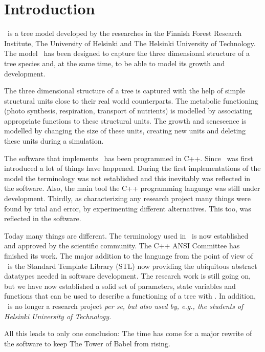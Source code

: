 \section{Introduction}

\lignum\ is a tree model developed by the researches in the  Finnish
Forest Research Institute, The University of Helsinki and The Helsinki
University of  Technology.   The model \lignum\  has  been designed to
capture the three dimensional structure of  a tree species and, at the
same time, to be able to model its growth and development.

The three dimensional structure of a tree is captured with the help of
simple structural  units close to their  real  world counterparts. The
metabolic  functioning (photo  synthesis,  respiration,  transport  of
nutrients) is modelled by  associating appropriate functions to  these
structural units.  The growth and  senescence is  modelled by changing
the size of  these units, creating  new units and deleting these units
during a simulation.

The  software  that implements \lignum\  has   been programmed in C++.
Since   \lignum\   was      first    introduced  \cite{salminen:omt94,
perttunen:aob96}  a lot  of things   have  happened. During the  first
implementations of the model  the terminology was not  established and
this inevitably was reflected in the software. Also, the main tool the
C++ programming  language  was still  under development.   Thirdly, as
characterizing any  research project many things  were found  by trial
and  error, by experimenting    different alternatives. This  too, was
reflected in the software.

Today many things are different.   The terminology used in \lignum\ is
now established and approved by the scientific community. The C++ ANSI
Committee has finished  its work.  The major addition  to the language
from the  point of view of  \lignum\ is the  Standard Template Library
(STL)  now  providing  the  ubiquitous abstract  datatypes  needed  in
software development.   The research  work is still  going on,  but we
have now  established a solid  set of parameters, state  variables and
functions that can be used to describe a functioning of a tree with
\lignum. In addition, \lignum\ is no longer a research project \it per
se\rm, but also used by, e.g.,  the students of Helsinki University of
Technology.

All this leads to only one  conclusion: The time has  come for a major
rewrite of the software to keep The Tower of Babel from rising.


